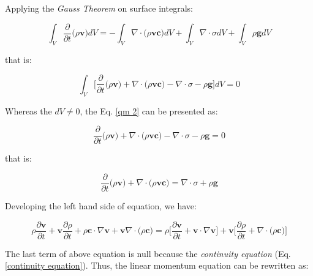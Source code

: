 \medskip
\noindent
Applying the \textit{Gauss Theorem} on surface integrals:

\begin{equation}
 \int_{V} \frac{\partial}{\partial t} \big( \rho \textbf{v} \big) dV
 = - 
 \int_{V} \nabla \cdot \big( \rho \textbf{v} \textbf{c} \big) dV
 +
 \int_{V} \nabla \cdot \sigma dV
 +
 \int_{V} \rho \textbf{g} dV
\end{equation}

\medskip
\noindent
that is:

\begin{equation} \label{qm 2}
 \int_{V} \Bigg[ \frac{\partial}{\partial t} \big( \rho \textbf{v} \big)
 + 
 \nabla \cdot \big( \rho \textbf{v} \textbf{c} \big)
 -
 \nabla \cdot \sigma
 -
 \rho \textbf{g} \Bigg] dV = 0
\end{equation}



\medskip
\noindent
Whereas the $dV \neq 0$,
the Eq. \ref{qm 2} can be presented as:



\begin{equation}
 \frac{\partial}{\partial t} \big( \rho \textbf{v} \big)
 + 
 \nabla \cdot \big( \rho \textbf{v} \textbf{c} \big)
 -
 \nabla \cdot \sigma
 -
 \rho \textbf{g} = 0
\end{equation}


\medskip
\noindent
that is:

\begin{equation}
 \frac{\partial}{\partial t} \big( \rho \textbf{v} \big) 
 +
 \nabla \cdot \big( \rho \textbf{v} \textbf{c} \big)
 =
 \nabla \cdot \sigma
 +
 \rho \textbf{g}
\end{equation}

\medskip
\noindent
Developing the left hand side of equation, we have:

\begin{equation}
 \rho \frac{\partial \textbf{v}}{\partial t}
 +
 \textbf{v} \frac{\partial \rho}{\partial t}
 +
 \rho \textbf{c} \cdot \nabla \textbf{v}
 + 
 \textbf{v} \nabla \cdot \big( \rho \textbf{c} \big)
 =
 \rho \Bigg[ \frac{\partial \textbf{v}}{\partial t} + \textbf{v} \cdot \nabla \textbf{v} \Bigg]
 +
 \textbf{v} \Bigg[ \frac{\partial \rho}{\partial t} + \nabla \cdot \big( \rho \textbf{c} \big) \Bigg]
\end{equation}

\newpage
The last term of above equation is null because
 the \textit{continuity equation} (Eq. \ref{continuity equation}).
Thus, the linear momentum equation can be rewritten as:

